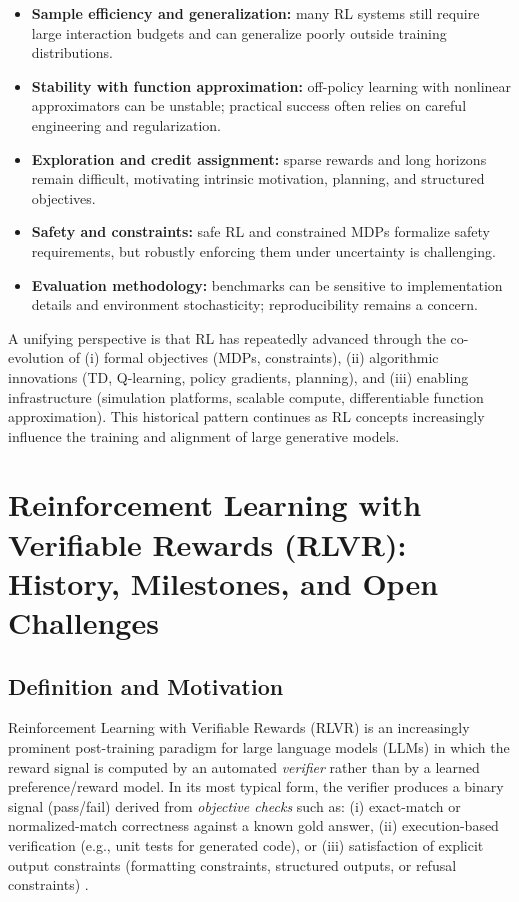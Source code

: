 \documentclass[sigconf]{acmart}
\begin{document}
\begin{itemize}
  \item \textbf{Sample efficiency and generalization:} many RL systems still require large interaction budgets and can generalize poorly outside training distributions.\cite{sutton2018book}
  \item \textbf{Stability with function approximation:} off-policy learning with nonlinear approximators can be unstable; practical success often relies on careful engineering and regularization.\cite{mnih2015dqn}
  \item \textbf{Exploration and credit assignment:} sparse rewards and long horizons remain difficult, motivating intrinsic motivation, planning, and structured objectives.\cite{sutton1990dyna}
  \item \textbf{Safety and constraints:} safe RL and constrained MDPs formalize safety requirements, but robustly enforcing them under uncertainty is challenging.\cite{altman1999cmdp,garcia2015safe}
  \item \textbf{Evaluation methodology:} benchmarks can be sensitive to implementation details and environment stochasticity; reproducibility remains a concern.\cite{henderson2018deep}
\end{itemize}

A unifying perspective is that RL has repeatedly advanced through the co-evolution of (i) formal objectives (MDPs, constraints), (ii) algorithmic innovations (TD, Q-learning, policy gradients, planning), and (iii) enabling infrastructure (simulation platforms, scalable compute, differentiable function approximation).
This historical pattern continues as RL concepts increasingly influence the training and alignment of large generative models.


\section{Reinforcement Learning with Verifiable Rewards (RLVR): History, Milestones, and Open Challenges}
\label{sec:rlvr_history}

\subsection{Definition and Motivation}
Reinforcement Learning with Verifiable Rewards (RLVR) is an increasingly prominent post-training paradigm for large language models (LLMs) in which the reward signal is computed by an automated \emph{verifier} rather than by a learned preference/reward model. In its most typical form, the verifier produces a binary signal (pass/fail) derived from \emph{objective checks} such as: (i) exact-match or normalized-match correctness against a known gold answer, (ii) execution-based verification (e.g., unit tests for generated code), or (iii) satisfaction of explicit output constraints (formatting constraints, structured outputs, or refusal constraints) \cite{lambert2024tulu3,mroueh2025grpo}.
\end{document}
